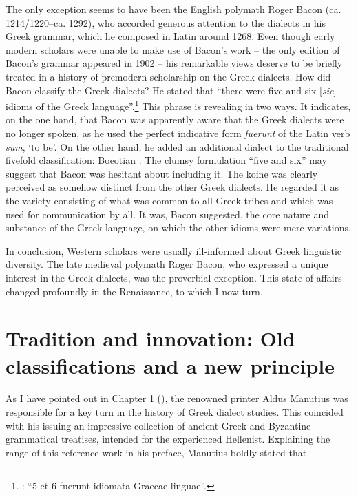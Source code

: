 The only exception seems to have been the English polymath Roger Bacon (ca. 1214/1220–ca. 1292), who accorded generous attention to the dialects in his Greek grammar, which he composed in Latin around 1268. Even though early modern scholars were unable to make use of Bacon’s work – the only edition of Bacon’s grammar appeared in 1902 – his remarkable views deserve to be briefly treated in a history of premodern scholarship on the Greek dialects. How did Bacon classify the Greek dialects? He stated that “there were five and six [\textit{sic}] idioms of the Greek language”.\footnote{\citet[26]{Bacon1902}: “5 et 6 fuerunt idiomata Graecae linguae”.} This phrase is revealing in two ways. It indicates, on the one hand, that Bacon was apparently aware that the Greek dialects were no longer spoken, as he used the perfect indicative form \textit{fuerunt} of the Latin verb \textit{sum}, ‘to be’. On the other hand, he added an additional dialect to the traditional fivefold classification: Boeotian \citep[27]{Bacon1902}. The clumsy formulation “five and six” may suggest that Bacon was hesitant about including it. The koine was clearly perceived as somehow distinct from the other Greek dialects. He regarded it as the variety consisting of what was common to all Greek tribes and which was used for communication by all. It was, Bacon suggested, the core nature and substance of the Greek language, on which the other idioms were mere variations.

In conclusion, Western scholars were usually ill-informed about Greek linguistic diversity. The late medieval polymath Roger Bacon, who expressed a unique interest in the Greek dialects, was the proverbial exception. This state of affairs changed profoundly in the Renaissance, to which I now turn.

\section{Tradition and innovation: Old classifications and a new principle}

As I have pointed out in Chapter 1 (), the renowned printer Aldus Manutius was responsible for a key turn in the history of Greek dialect studies. This coincided with his issuing an impressive collection of ancient Greek and Byzantine grammatical treatises, intended for the experienced Hellenist. Explaining the range of this reference work in his preface, Manutius boldly stated that

